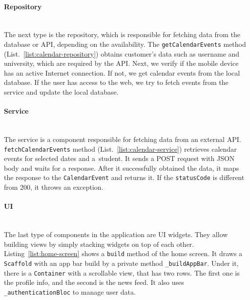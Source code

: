 


\paragraph{\large{Repository}}\mbox{}\\[2pt]
The next type is the repository, which is responsible for fetching data from the database or API, depending on the availability. The \texttt{getCalendarEvents} method (List.~\ref{list:calendar-repository}) obtains customer's data such as username and university, which are required by the API. Next, we verify if the mobile device has an active Internet connection. If not, we get calendar events from the local database. If the user has access to the web, we try to fetch events from the service and update the local database.




\paragraph{\large{Service}}\mbox{}\\[2pt]
The service is a component responsible for fetching data from an external API. \texttt{fetchCalendarEvents} method (List.~\ref{list:calendar-service}) retrieves calendar events for selected dates and a~student. It sends a POST request with JSON body and waits for a response. After it successfully obtained the data, it maps the response to the \texttt{CalendarEvent} and returns it. If the \texttt{statusCode} is different from 200, it throws an exception.




\paragraph{\large{UI}}\mbox{}\\[2pt]
The last type of components in the application are UI widgets. They allow building views by simply stacking widgets on top of each other. Listing~\ref{list:home-screen} shows a \texttt{build} method of the home screen. It draws a \texttt{Scaffold} with an app bar build by a private method \texttt{\_buildAppBar}. Under it, there is a \texttt{Container} with a scrollable view, that has two rows. The first one is the profile info, and the second is the news feed. It also uses \texttt{\_authenticationBloc} to manage user data.

